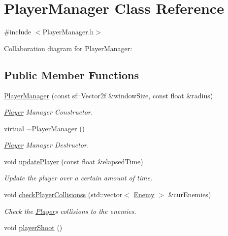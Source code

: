 \hypertarget{class_player_manager}{}\section{Player\+Manager Class Reference}
\label{class_player_manager}


{\ttfamily \#include $<$Player\+Manager.\+h$>$}



Collaboration diagram for Player\+Manager\+:
\subsection*{Public Member Functions}
\begin{DoxyCompactItemize}
\item 
\hyperlink{class_player_manager_aa2ce60af19b9d80bd884e2edaea726d6}{Player\+Manager} (const sf\+::\+Vector2f \&window\+Size, const float \&radius)
\begin{DoxyCompactList}\small\item\em \hyperlink{class_player}{Player} Manager Constructor. \end{DoxyCompactList}\item 
virtual \hyperlink{class_player_manager_ab53de6b16914b7591fc2bd3038069ac7}{$\sim$\+Player\+Manager} ()
\begin{DoxyCompactList}\small\item\em \hyperlink{class_player}{Player} Manager Destructor. \end{DoxyCompactList}\item 
void \hyperlink{class_player_manager_a171946405d72c219802315721e09467d}{update\+Player} (const float \&elapsed\+Time)
\begin{DoxyCompactList}\small\item\em Update the player over a certain amount of time. \end{DoxyCompactList}\item 
void \hyperlink{class_player_manager_ac4bad97c7d281a47a876d7cee5f864bd}{check\+Player\+Collisionss} (std\+::vector$<$ \hyperlink{class_enemy}{Enemy} $>$ \&cur\+Enemies)
\begin{DoxyCompactList}\small\item\em Check the \hyperlink{class_player}{Player}\textquotesingle{}s collisions to the enemies. \end{DoxyCompactList}\item 
void \hyperlink{class_player_manager_a7a61c6484a3dd12293d2481c5f61fb71}{player\+Shoot} ()

\end{DoxyCompactItemize}
